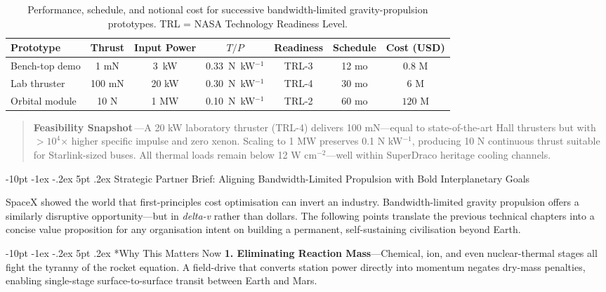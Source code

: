 \documentclass[12pt,letterpaper]{book}
\makeatletter
\renewcommand\section{\@startsection {section}{1}{\z@}%
                {-10pt \@plus -1ex \@minus -.2ex}%
                {5pt \@plus.2ex}%
                {\normalfont\large\bfseries}}
\makeatother
\begin{document}
\begin{table}[h!]
\centering
\begin{tabular}{@{}lcccccc@{}}
\toprule
Prototype & Thrust & Input Power & $T/P$ & Readiness & Schedule & Cost (USD) \\
\midrule
Bench-top demo & 1 mN & 3~kW & 0.33~N~kW$^{-1}$ & TRL-3 & 12 mo & $0.8$ M \\
Lab thruster & 100 mN & 20 kW & 0.30~N~kW$^{-1}$ & TRL-4 & 30 mo & $6$ M \\
Orbital module & 10 N & 1 MW & 0.10~N~kW$^{-1}$ & TRL-2 & 60 mo & $120$ M \\
\bottomrule
\end{tabular}
\caption{Performance, schedule, and notional cost for successive bandwidth-limited gravity-propulsion prototypes.  TRL = NASA Technology Readiness Level.}
\end{table}

\begin{quote}\small
\textbf{Feasibility Snapshot}\,—A 20 kW laboratory thruster (TRL-4) delivers 100 mN—equal to state-of-the-art Hall thrusters but with $>10^{4}$× higher specific impulse and zero xenon.  Scaling to 1 MW preserves 0.1 N kW$^{-1}$, producing 10 N continuous thrust suitable for Starlink-sized buses.  All thermal loads remain below 12 W cm$^{-2}$—well within SuperDraco heritage cooling channels.
\end{quote}

\section{Strategic Partner Brief: Aligning Bandwidth-Limited Propulsion with Bold Interplanetary Goals}

SpaceX showed the world that first-principles cost optimisation can invert an industry.  Bandwidth-limited gravity propulsion offers a similarly disruptive opportunity—but in \emph{delta-v} rather than dollars.  The following points translate the previous technical chapters into a concise value proposition for any organisation intent on building a permanent, self-sustaining civilisation beyond Earth.

\section*{Why This Matters Now}
\textbf{1. Eliminating Reaction Mass}\;—Chemical, ion, and even nuclear-thermal stages all fight the tyranny of the rocket equation.  A field-drive that converts station power directly into momentum negates dry-mass penalties, enabling single-stage surface-to-surface transit between Earth and Mars.
\end{document}
